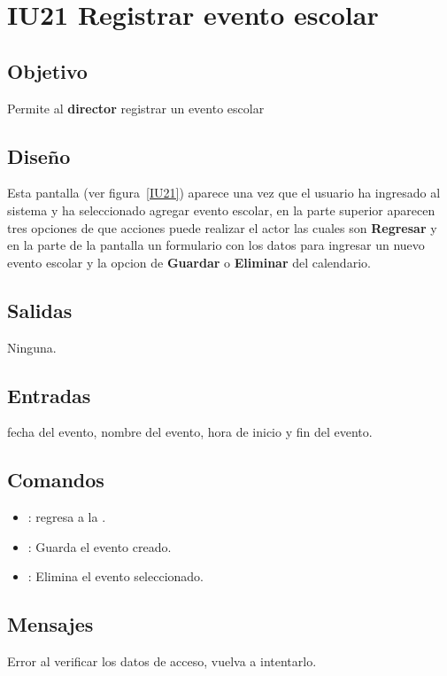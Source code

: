 \section{IU21 Registrar evento escolar}

\subsection{Objetivo}
	Permite al {\bf director} registrar un evento escolar

\subsection{Diseño}
	Esta pantalla  (ver figura~\ref{IU21}) aparece una vez que el usuario ha ingresado al sistema y ha seleccionado agregar evento escolar,
 en la parte superior aparecen tres opciones de que acciones puede realizar el actor las cuales son {\bf Regresar} y en la parte de la pantalla un formulario con los datos para ingresar un nuevo evento escolar y la opcion de {\bf Guardar} o {\bf Eliminar} del calendario. 

 

\subsection{Salidas}

	Ninguna.

\subsection{Entradas}
fecha del evento, nombre del evento, hora de inicio y fin del evento.

\subsection{Comandos}
\begin{itemize}
	\item {}: regresa a la .
	\item {}: Guarda el evento creado.
           \item {}: Elimina el evento seleccionado.
\end{itemize}

\subsection{Mensajes}

\begin{Citemize}
	\item Error al verificar los datos de acceso, vuelva a intentarlo.
\end{Citemize}

